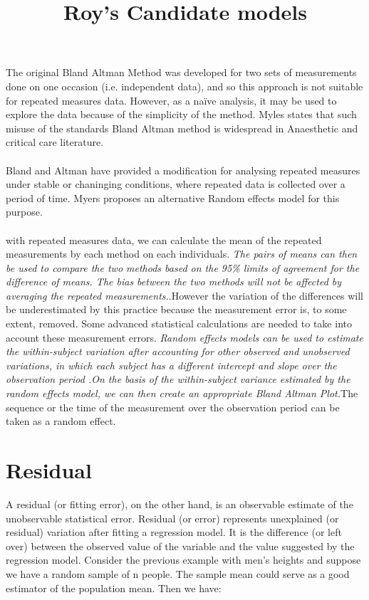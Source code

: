 \documentclass[12pt, a4paper]{report}
\theoremstyle{plain}
\theoremstyle{definition}
\theoremstyle{remark}
\begin{document}
\title{Roy's Candidate models}
The original Bland Altman Method was developed for two sets of
measurements done on one occasion (i.e. independent data), and so
this approach is not suitable for repeated measures data. However,
as a naïve analysis, it may be used to explore the data because of
the simplicity of the method. Myles states that such misuse of the
standards Bland Altman method is widespread in Anaesthetic and
critical care literature.
\\
\\
Bland and Altman have provided a modification for analysing
repeated measures under stable or chaninging conditions, where
repeated data is collected over a period of time. Myers proposes
an alternative Random effects model for this purpose.
\\
\\
with repeated measures data, we can
calculate the mean of the repeated measurements by each method on
each individuals. \emph{ The pairs of means can then be used to
	compare the two methods based on the 95\% limits of agreement for
	the difference of means. The bias between the two methods will not
	be affected by averaging the repeated measurements.}.However the
variation of the differences will be underestimated by this
practice because the measurement error is, to some extent,
removed. Some advanced statistical calculations are needed to take
into account these measurement errors. \emph{Random effects models
	can be used to estimate the within-subject variation after
	accounting for other observed and unobserved variations, in which
	each subject has a different intercept and slope over the
	observation period .On the basis of the within-subject variance
	estimated by the random effects model, we can then create an
	appropriate Bland Altman Plot.}The sequence or the time of the
measurement over the observation period can be taken as a random
effect.

	\section{Residual}
	
	A residual (or fitting error), on the other hand, is an observable estimate of the unobservable statistical error.
	Residual (or error) represents unexplained (or residual) variation after fitting a regression model. It is the difference (or left over) between the observed value of the variable and the value suggested by the regression model.
	Consider the previous example with men's heights and suppose we have a random sample of n people. The sample mean could serve as a good estimator of the population mean. Then we have:
	
\end{document}
